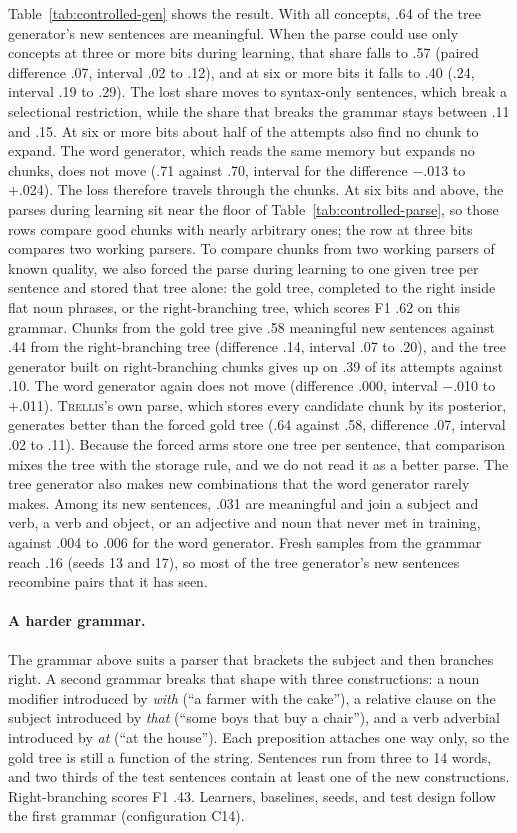 \documentclass[11pt,letterpaper]{article}
\newcommand{\trellis}{\textsc{Trellis}}
\begin{document}
Table~\ref{tab:controlled-gen} shows the result. With all concepts, .64 of the tree generator's new sentences are meaningful. When the parse could use only concepts at three or more bits during learning, that share falls to .57 (paired difference .07, interval .02 to .12), and at six or more bits it falls to .40 (.24, interval .19 to .29).
The lost share moves to syntax-only sentences, which break a selectional restriction, while the share that breaks the grammar stays between .11 and .15. At six or more bits about half of the attempts also find no chunk to expand.
The word generator, which reads the same memory but expands no chunks, does not move (.71 against .70, interval for the difference $-$.013 to +.024). The loss therefore travels through the chunks.
At six bits and above, the parses during learning sit near the floor of Table~\ref{tab:controlled-parse}, so those rows compare good chunks with nearly arbitrary ones; the row at three bits compares two working parsers.
To compare chunks from two working parsers of known quality, we also forced the parse during learning to one given tree per sentence and stored that tree alone: the gold tree, completed to the right inside flat noun phrases, or the right-branching tree, which scores F1 .62 on this grammar.
Chunks from the gold tree give .58 meaningful new sentences against .44 from the right-branching tree (difference .14, interval .07 to .20), and the tree generator built on right-branching chunks gives up on .39 of its attempts against .10. The word generator again does not move (difference .000, interval $-$.010 to +.011).
\trellis{}'s own parse, which stores every candidate chunk by its posterior, generates better than the forced gold tree (.64 against .58, difference .07, interval .02 to .11). Because the forced arms store one tree per sentence, that comparison mixes the tree with the storage rule, and we do not read it as a better parse.
The tree generator also makes new combinations that the word generator rarely makes. Among its new sentences, .031 are meaningful and join a subject and verb, a verb and object, or an adjective and noun that never met in training, against .004 to .006 for the word generator. Fresh samples from the grammar reach .16 (seeds 13 and 17), so most of the tree generator's new sentences recombine pairs that it has seen.

\paragraph{A harder grammar.} The grammar above suits a parser that brackets the subject and then branches right. A second grammar breaks that shape with three constructions: a noun modifier introduced by \emph{with} (``a farmer with the cake''), a relative clause on the subject introduced by \emph{that} (``some boys that buy a chair''), and a verb adverbial introduced by \emph{at} (``at the house''). Each preposition attaches one way only, so the gold tree is still a function of the string. Sentences run from three to 14 words, and two thirds of the test sentences contain at least one of the new constructions. Right-branching scores F1 .43. Learners, baselines, seeds, and test design follow the first grammar (configuration C14).
\end{document}
